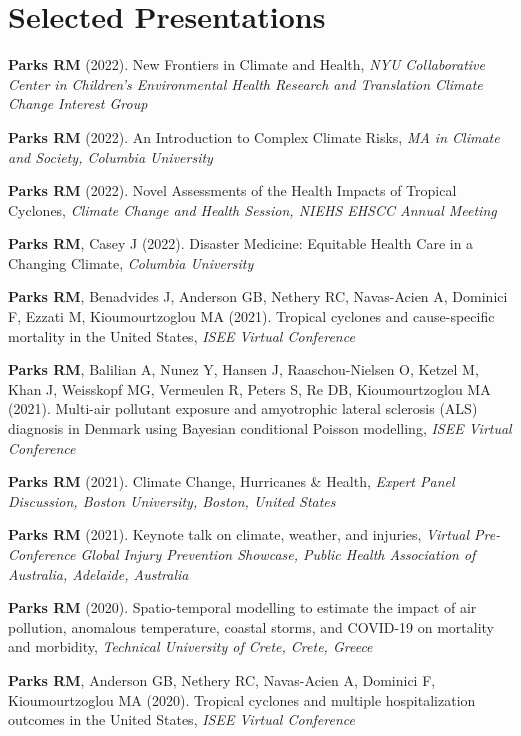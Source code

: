 \section*{Selected Presentations}

\noindent \textbf{Parks RM} (2022). New Frontiers in Climate and Health, \textit{NYU Collaborative Center in Children's Environmental Health Research and Translation Climate Change Interest Group
} \bigskip

\noindent \textbf{Parks RM} (2022). An Introduction to Complex Climate Risks, \textit{MA in Climate and Society, Columbia University} \bigskip

\noindent \textbf{Parks RM} (2022). Novel Assessments of the Health Impacts of Tropical Cyclones, \textit{Climate Change and Health Session, NIEHS EHSCC Annual Meeting} \bigskip

\noindent \textbf{Parks RM}, Casey J (2022). Disaster Medicine: Equitable Health Care in a Changing Climate, \textit{Columbia University} \bigskip

\noindent \textbf{Parks RM}, Benadvides J, Anderson GB, Nethery RC, Navas-Acien A, Dominici F, Ezzati M, Kioumourtzoglou MA (2021). Tropical cyclones and cause-specific mortality in the United States, \textit{ISEE Virtual Conference} \bigskip

\noindent \textbf{Parks RM}, Balilian A, Nunez Y, Hansen J, Raaschou-Nielsen O, Ketzel M, Khan J, Weisskopf MG, Vermeulen R, Peters S, Re DB, Kioumourtzoglou MA (2021). Multi-air pollutant exposure and amyotrophic lateral sclerosis (ALS) diagnosis in Denmark using Bayesian conditional Poisson modelling, \textit{ISEE Virtual Conference} \bigskip

\noindent \textbf{Parks RM} (2021). Climate Change, Hurricanes \& Health,  \textit{Expert Panel Discussion, Boston University, Boston, United States} \bigskip

\noindent \textbf{Parks RM} (2021). Keynote talk on climate, weather, and injuries,  \textit{Virtual Pre-Conference Global Injury Prevention Showcase, Public Health Association of Australia, Adelaide, Australia} \bigskip

\noindent \textbf{Parks RM} (2020). Spatio-temporal modelling to estimate the impact of air pollution, anomalous temperature, coastal storms, and COVID-19 on mortality and morbidity,  \textit{Technical University of Crete, Crete, Greece} \bigskip

\noindent \textbf{Parks RM}, Anderson GB, Nethery RC, Navas-Acien A, Dominici F, Kioumourtzoglou MA (2020). Tropical cyclones and multiple hospitalization outcomes in the United States, \textit{ISEE Virtual Conference} \bigskip

